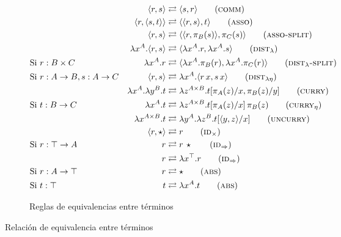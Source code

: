 \begin{figure}[H]
	\centering
	\begin{align}
		& &\langle r,s \rangle &\rightleftarrows \langle s,r \rangle \tag{\textsc{comm}} \\
		& &\langle r, \langle s,t \rangle \rangle &\rightleftarrows \langle \langle r, s \rangle, t \rangle 	\tag{\textsc{asso}} \\
		& &\langle r, s \rangle &\rightleftarrows \langle \langle r, \pi_B (s) \rangle, \pi_C (s) \rangle 	\tag{\textsc{asso-split}} \\
		& &\lambda x^A. \langle r,s \rangle &\rightleftarrows \langle \lambda x^A.r, \lambda x^A.s \rangle 	\tag{$\textsc{dist}_{\lambda}$} \\
		&\text{Si } r: B \times C &\lambda x^A. r &\rightleftarrows \langle \lambda x^A. \pi_B(r), \lambda x^A.\pi_C(r) \rangle \tag{$\textsc{dist}_{\lambda}\textsc{-split}$} \\
		&\text{Si } r: A \rightarrow B, s : A \rightarrow C &\langle r,s \rangle &\rightleftarrows \lambda x^A. \langle r \, x,s \, x \rangle \tag{$\textsc{dist}_{\lambda\eta}$} \\
		& &\lambda x^A. \lambda y^B. t &\rightleftarrows \lambda z^{A \times B}. t[\pi_A(z)/x, \pi_B(z)/y]
		\tag{\textsc{curry}} \\
		&\text{Si } t: B \rightarrow C &\lambda x^A. t &\rightleftarrows \lambda z^{A \times B}. t[\pi_A(z)/x]\, \pi_B(z) \tag{$\textsc{curry}_{\eta}$} \\
		& &\lambda x^{A \times B}. t &\rightleftarrows \lambda y^A. \lambda z^B. t[\langle y, z \rangle/x] \tag{\textsc{uncurry}} \\
		& &\langle r, \star \rangle &\rightleftarrows r \tag{$\textsc{id}_\times$} \\
		&\text{Si } r: \top \rightarrow A &r &\rightleftarrows r \, \star \tag{$\textsc{id}_\Rightarrow$} \\
		& &r &\rightleftarrows \lambda x^\top. r \tag{$\textsc{id}_\Rightarrow$} \\
		&\text{Si } r: A \rightarrow \top &r &\rightleftarrows \star \tag{\textsc{abs}} \\
		&\text{Si } t: \top &t &\rightleftarrows \lambda x^A. t \tag{\textsc{abs}}
	\end{align}
	
	\caption{Reglas de equivalencias entre términos}
\end{figure}

\begin{codigo}
	Relación de equivalencia entre términos
	
\end{codigo}


